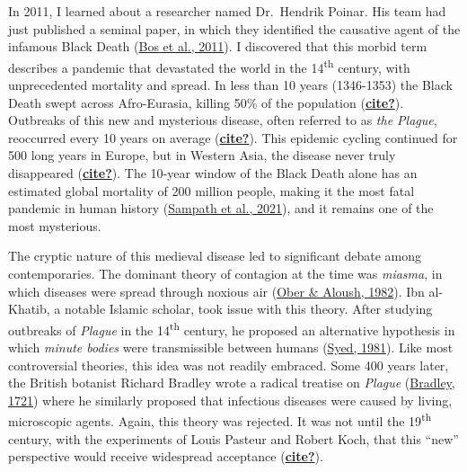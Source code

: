 \documentclass[
]{report}
\begin{document}
In 2011, I learned about a researcher named Dr.~Hendrik Poinar. His team
had just published a seminal paper, in which they identified the
causative agent of the infamous Black Death
(\protect\hyperlink{ref-bos2011DraftGenomeYersinia}{Bos et al., 2011}).
I discovered that this morbid term describes a pandemic that devastated
the world in the 14\textsuperscript{th} century, with unprecedented
mortality and spread. In less than 10 years (1346-1353) the Black Death
swept across Afro-Eurasia, killing 50\% of the population
(\protect\hyperlink{ref-cite}{\textbf{cite?}}). Outbreaks of this new
and mysterious disease, often referred to as \emph{the Plague},
reoccurred every 10 years on average
(\protect\hyperlink{ref-cite}{\textbf{cite?}}). This epidemic cycling
continued for 500 long years in Europe, but in Western Asia, the disease
never truly disappeared (\protect\hyperlink{ref-cite}{\textbf{cite?}}).
The 10-year window of the Black Death alone has an estimated global
mortality of 200 million people, making it the most fatal pandemic in
human history
(\protect\hyperlink{ref-sampath2021PandemicsThroughoutHistory}{Sampath
et al., 2021}), and it remains one of the most mysterious.

The cryptic nature of this medieval disease led to significant debate
among contemporaries. The dominant theory of contagion at the time was
\emph{miasma}, in which diseases were spread through noxious air
(\protect\hyperlink{ref-ober1982PlagueGranada13481349}{Ober \& Aloush,
1982}). Ibn al-Khatib, a notable Islamic scholar, took issue with this
theory. After studying outbreaks of \emph{Plague} in the
14\textsuperscript{th} century, he proposed an alternative hypothesis in
which \emph{minute bodies} were transmissible between humans
(\protect\hyperlink{ref-syed1981IslamicMedicine1000}{Syed, 1981}). Like
most controversial theories, this idea was not readily embraced. Some
400 years later, the British botanist Richard Bradley wrote a radical
treatise on \emph{Plague}
(\protect\hyperlink{ref-bradley1721PlagueMarseillesConsider}{Bradley,
1721}) where he similarly proposed that infectious diseases were caused
by living, microscopic agents. Again, this theory was rejected. It was
not until the 19\textsuperscript{th} century, with the experiments of
Louis Pasteur and Robert Koch, that this ``new'' perspective would
receive widespread acceptance
(\protect\hyperlink{ref-cite}{\textbf{cite?}}).
\end{document}
